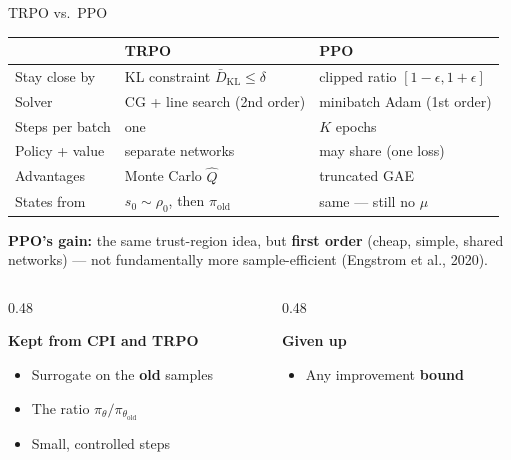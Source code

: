 \documentclass[aspectratio=169]{beamer}
\newcommand{\told}{\theta_{\mathrm{old}}}
\newcommand{\piold}{\pi_{\mathrm{old}}}
\begin{document}
\begin{frame}{TRPO vs.\ PPO}
  \begin{center}
  \renewcommand{\arraystretch}{1.15}
  \footnotesize
  \begin{tabular}{l l l}
    \toprule
     & \textbf{TRPO} & \textbf{\color{AtlasCool}PPO} \\
    \midrule
    Stay close by & KL constraint $\bar D_{\mathrm{KL}}\le\delta$ & clipped ratio $[1-\epsilon,1+\epsilon]$ \\
    Solver & CG + line search (2nd order) & minibatch Adam (1st order) \\
    Steps per batch & one & $K$ epochs \\
    Policy + value & separate networks & may share (one loss) \\
    Advantages & Monte Carlo $\hat Q$ & truncated GAE \\
    States from & $s_0\sim\rho_0$, then $\piold$ & same --- still no $\mu$ \\
    \bottomrule
  \end{tabular}
  \end{center}
  \vspace{-4pt}
  {\centering\footnotesize\textbf{\color{AtlasCool}PPO's gain:} the same trust-region idea, but \textbf{first order} (cheap, simple, shared networks) --- not fundamentally more sample-efficient (Engstrom et al., 2020).\par}
  \vspace{-4pt}
  \begin{columns}[t]
    \begin{column}{0.48\textwidth}
      \begin{goodbox}
        \footnotesize\textbf{Kept from CPI and TRPO}
        \begin{itemize}
          \item Surrogate on the \textbf{old} samples
          \item The ratio $\pi_\theta/\pi_{\told}$
          \item Small, controlled steps
        \end{itemize}
      \end{goodbox}
    \end{column}
    \begin{column}{0.48\textwidth}
      \begin{badbox}
        \footnotesize\textbf{Given up}
        \begin{itemize}
          \item Any improvement \textbf{bound}

\end{itemize}
\end{badbox}
\end{column}
\end{columns}
\end{frame}
\end{document}
